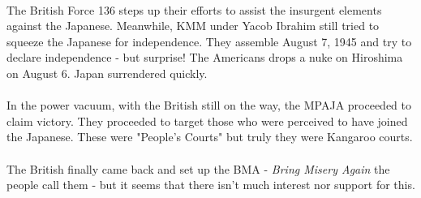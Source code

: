 \documentclass[a4paper]{article}
\begin{document}
\\
The British Force 136 steps up their efforts to assist the insurgent elements against the Japanese. Meanwhile, KMM under Yacob Ibrahim still tried to squeeze the Japanese for independence. They assemble August 7, 1945 and try to declare independence - but surprise! The Americans drops a nuke on Hiroshima on August 6. Japan surrendered quickly. \\
\\
In the power vacuum, with the British still on the way, the MPAJA proceeded to claim victory. They proceeded to target those who were perceived to have joined the Japanese. These were "People's Courts" but truly they were Kangaroo courts. \\
\\
The British finally came back and set up the BMA - \textit{Bring Misery Again} the people call them - but it seems that there isn't much interest nor support for this.
\end{document}
